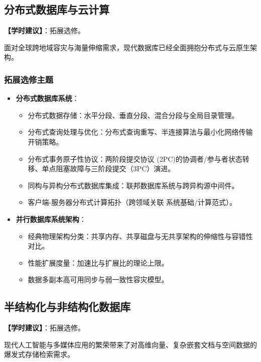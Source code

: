 \subsection{分布式数据库与云计算}
\textbf{【学时建议】}：拓展选修。

面对全球跨地域容灾与海量伸缩需求，现代数据库已经全面拥抱分布式与云原生架构。

\subsubsection{拓展选修主题}
\begin{itemize}
    \item \textbf{分布式数据库系统}：
    \begin{itemize}
        \item 分布式数据存储：水平分段、垂直分段、混合分段与全局目录管理。
        \item 分布式查询处理与优化：分布式查询重写、半连接算法与最小化网络传输开销策略。
        \item 分布式事务原子性协议：两阶段提交协议 (2PC)的协调者/参与者状态转移、单点阻塞故障与三阶段提交（3PC）演进。
        \item 同构与异构分布式数据库集成：联邦数据库系统与跨异构源中间件。
        \item 客户端-服务器分布式计算拓扑（跨领域关联 系统基础/计算范式）。
    \end{itemize}
    \item \textbf{并行数据库系统架构}：
    \begin{itemize}
        \item 经典物理架构分类：共享内存、共享磁盘与无共享架构的伸缩性与容错性对比。
        \item 性能扩展度量：加速比与扩展比的理论上限。
        \item 数据多副本高可用同步与弱一致性容灾模型。
    \end{itemize}
\end{itemize}

\subsection{半结构化与非结构化数据库}
\textbf{【学时建议】}：拓展选修。

现代人工智能与多媒体应用的繁荣带来了对高维向量、复杂嵌套文档与空间数据的爆发式存储检索需求。

